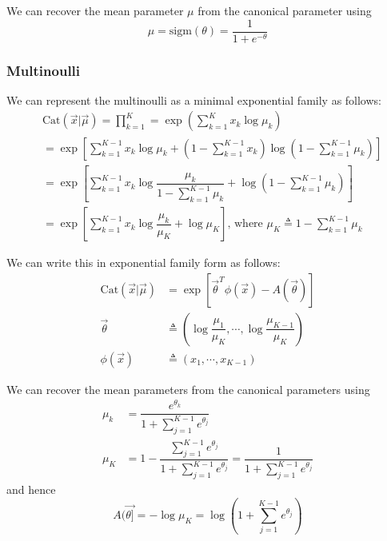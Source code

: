 We can recover the mean parameter $\mu$ from the canonical parameter using
\begin{equation}
\mu=\mathrm{sigm}(\theta)=\dfrac{1}{1+e^{-\theta}}
\end{equation}


\subsubsection{Multinoulli}
We can represent the multinoulli as a minimal exponential family as follows:
\begin{equation*}\begin{split}
& \mathrm{Cat}(\vec{x}|\vec{\mu}) = \prod\limits_{k=1}^K = \exp\left(\sum\limits_{k=1}^K x_k\log\mu_k\right) \\
    & = \exp\left[\sum\limits_{k=1}^{K-1} x_k\log\mu_k+  (1-\sum\limits_{k=1}^{K-1} x_k)\log(1-\sum\limits_{k=1}^{K-1} \mu_k)\right] \\
	& = \exp\left[\sum\limits_{k=1}^{K-1} x_k\log\dfrac{\mu_k}{1-\sum_{k=1}^{K-1} \mu_k} + \log(1-\sum\limits_{k=1}^{K-1} \mu_k) \right] \\
	& = \exp\left[\sum\limits_{k=1}^{K-1} x_k\log\dfrac{\mu_k}{\mu_K}+\log\mu_K\right] \text{, where } \mu_K \triangleq 1-\sum\limits_{k=1}^{K-1} \mu_k
\end{split}\end{equation*}

We can write this in exponential family form as follows:
\begin{align}
\mathrm{Cat}(\vec{x}|\vec{\mu}) & = \exp[\vec{\theta}^T\phi(\vec{x})-A(\vec{\theta})] \\
\vec{\theta} & \triangleq (\log\dfrac{\mu_1}{\mu_K},\cdots,\log\dfrac{\mu_{K-1}}{\mu_K}) \\
\phi(\vec{x}) & \triangleq (x_1,\cdots,x_{K-1})
\end{align}

We can recover the mean parameters from the canonical parameters using
\begin{align}
\mu_k & = \dfrac{e^{\theta_k}}{1+\sum_{j=1}^{K-1} e^{\theta_j}} \\
\mu_K & = 1- \dfrac{\sum_{j=1}^{K-1} e^{\theta_j}}{1+\sum_{j=1}^{K-1} e^{\theta_j}}=\dfrac{1}{1+\sum_{j=1}^{K-1} e^{\theta_j}}
\end{align}
and hence
\begin{equation}
A(\vec{\theta]} = -\log\mu_K=\log(1+\sum\limits_{j=1}^{K-1} e^{\theta_j})
\end{equation}


